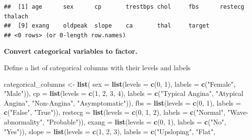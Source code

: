 \documentclass[
]{article}
\newenvironment{Shaded}{\begin{snugshade}}{\end{snugshade}}
\newcommand{\AttributeTok}[1]{\textcolor[rgb]{0.13,0.29,0.53}{#1}}
\newcommand{\DecValTok}[1]{\textcolor[rgb]{0.00,0.00,0.81}{#1}}
\newcommand{\FunctionTok}[1]{\textcolor[rgb]{0.13,0.29,0.53}{\textbf{#1}}}
\newcommand{\NormalTok}[1]{#1}
\newcommand{\OtherTok}[1]{\textcolor[rgb]{0.56,0.35,0.01}{#1}}
\newcommand{\StringTok}[1]{\textcolor[rgb]{0.31,0.60,0.02}{#1}}
\begin{document}
\begin{verbatim}
##  [1] age      sex      cp       trestbps chol     fbs      restecg  thalach 
##  [9] exang    oldpeak  slope    ca       thal     target  
## <0 rows> (or 0-length row.names)
\end{verbatim}

\textbf{Convert categorical variables to factor.}

Define a list of categorical columns with their levels and labels

\begin{Shaded}
\begin{Highlighting}[]
\NormalTok{categorical\_columns }\OtherTok{\textless{}{-}} \FunctionTok{list}\NormalTok{(}
  \AttributeTok{sex =} \FunctionTok{list}\NormalTok{(}\AttributeTok{levels =} \FunctionTok{c}\NormalTok{(}\DecValTok{0}\NormalTok{, }\DecValTok{1}\NormalTok{), }\AttributeTok{labels =} \FunctionTok{c}\NormalTok{(}\StringTok{"Female"}\NormalTok{, }\StringTok{"Male"}\NormalTok{)),}
  \AttributeTok{cp =} \FunctionTok{list}\NormalTok{(}\AttributeTok{levels =} \FunctionTok{c}\NormalTok{(}\DecValTok{1}\NormalTok{, }\DecValTok{2}\NormalTok{, }\DecValTok{3}\NormalTok{, }\DecValTok{4}\NormalTok{), }\AttributeTok{labels =} \FunctionTok{c}\NormalTok{(}\StringTok{"Typical Angina"}\NormalTok{, }
                                               \StringTok{"Atypical Angina"}\NormalTok{, }\StringTok{"Non{-}Angina"}\NormalTok{,}
                                               \StringTok{"Asymptomatic"}\NormalTok{)),}
  \AttributeTok{fbs =} \FunctionTok{list}\NormalTok{(}\AttributeTok{levels =} \FunctionTok{c}\NormalTok{(}\DecValTok{0}\NormalTok{, }\DecValTok{1}\NormalTok{), }\AttributeTok{labels =} \FunctionTok{c}\NormalTok{(}\StringTok{"False"}\NormalTok{, }\StringTok{"True"}\NormalTok{)),}
  \AttributeTok{restecg =} \FunctionTok{list}\NormalTok{(}\AttributeTok{levels =} \FunctionTok{c}\NormalTok{(}\DecValTok{0}\NormalTok{, }\DecValTok{1}\NormalTok{, }\DecValTok{2}\NormalTok{), }\AttributeTok{labels =} \FunctionTok{c}\NormalTok{(}\StringTok{"Normal"}\NormalTok{, }\StringTok{"Wave{-}abnormality"}\NormalTok{, }\StringTok{"Probable"}\NormalTok{)),}
  \AttributeTok{exang =} \FunctionTok{list}\NormalTok{(}\AttributeTok{levels =} \FunctionTok{c}\NormalTok{(}\DecValTok{0}\NormalTok{, }\DecValTok{1}\NormalTok{), }\AttributeTok{labels =} \FunctionTok{c}\NormalTok{(}\StringTok{"No"}\NormalTok{, }\StringTok{"Yes"}\NormalTok{)),}
  \AttributeTok{slope =} \FunctionTok{list}\NormalTok{(}\AttributeTok{levels =} \FunctionTok{c}\NormalTok{(}\DecValTok{1}\NormalTok{, }\DecValTok{2}\NormalTok{, }\DecValTok{3}\NormalTok{), }\AttributeTok{labels =} \FunctionTok{c}\NormalTok{(}\StringTok{"Upsloping"}\NormalTok{, }\StringTok{"Flat"}\NormalTok{, }

\end{Highlighting}
\end{Shaded}
\end{document}
